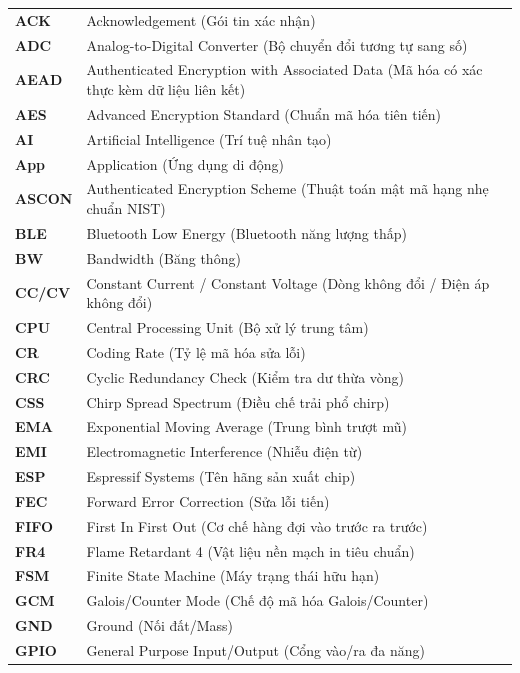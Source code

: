 \begin{longtable}{@{} p{} p{} @{}}
\textbf{ACK}    & Acknowledgement (Gói tin xác nhận) \\
\textbf{ADC}    & Analog-to-Digital Converter (Bộ chuyển đổi tương tự sang số) \\
\textbf{AEAD}   & Authenticated Encryption with Associated Data (Mã hóa có xác thực kèm dữ liệu liên kết) \\
\textbf{AES}    & Advanced Encryption Standard (Chuẩn mã hóa tiên tiến) \\
\textbf{AI}     & Artificial Intelligence (Trí tuệ nhân tạo) \\
\textbf{App}    & Application (Ứng dụng di động) \\
\textbf{ASCON}  & Authenticated Encryption Scheme (Thuật toán mật mã hạng nhẹ chuẩn NIST) \\
\textbf{BLE}    & Bluetooth Low Energy (Bluetooth năng lượng thấp) \\
\textbf{BW}     & Bandwidth (Băng thông) \\
\textbf{CC/CV}  & Constant Current / Constant Voltage (Dòng không đổi / Điện áp không đổi) \\
\textbf{CPU}    & Central Processing Unit (Bộ xử lý trung tâm) \\
\textbf{CR}     & Coding Rate (Tỷ lệ mã hóa sửa lỗi) \\
\textbf{CRC}    & Cyclic Redundancy Check (Kiểm tra dư thừa vòng) \\
\textbf{CSS}    & Chirp Spread Spectrum (Điều chế trải phổ chirp) \\
\textbf{EMA}    & Exponential Moving Average (Trung bình trượt mũ) \\
\textbf{EMI}    & Electromagnetic Interference (Nhiễu điện từ) \\
\textbf{ESP}    & Espressif Systems (Tên hãng sản xuất chip) \\
\textbf{FEC}    & Forward Error Correction (Sửa lỗi tiến) \\
\textbf{FIFO}   & First In First Out (Cơ chế hàng đợi vào trước ra trước) \\
\textbf{FR4}    & Flame Retardant 4 (Vật liệu nền mạch in tiêu chuẩn) \\
\textbf{FSM}    & Finite State Machine (Máy trạng thái hữu hạn) \\
\textbf{GCM}    & Galois/Counter Mode (Chế độ mã hóa Galois/Counter) \\
\textbf{GND}    & Ground (Nối đất/Mass) \\
\textbf{GPIO}   & General Purpose Input/Output (Cổng vào/ra đa năng) \\

\end{longtable}
